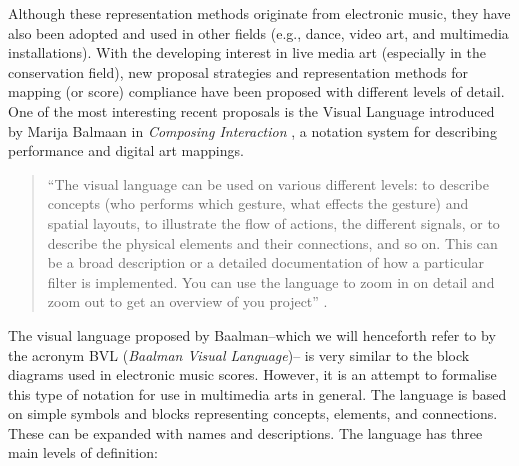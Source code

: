 Although these representation methods originate from electronic music, they have also been adopted and used in other fields (e.g., dance, video art, and multimedia installations). With the developing interest in live media art (especially in the conservation field), new proposal strategies and representation methods for mapping (or score) compliance have been proposed with different levels of detail. One of the most interesting recent proposals is the Visual Language introduced by Marija Balmaan in \textit{Composing Interaction} \cite{baalman2022composing}, a notation system for describing performance and digital art mappings.\\
\begin{quote}
    “The visual language can be used on various different levels: to describe concepts (who performs which gesture, what effects the gesture) and spatial layouts, to illustrate the flow of actions, the different signals, or to describe the physical elements and their connections, and so on. This can be a broad description or a detailed documentation of how a particular filter is implemented. You can use the language to zoom in on detail and zoom out to get an overview of you project” \cite{baalman2022composing}.
\end{quote}
The visual language proposed by Baalman–which we will henceforth refer to by the acronym BVL (\textit{Baalman Visual Language})– is very similar to the block diagrams used in electronic music scores. However, it is an attempt to formalise this type of notation for use in multimedia arts in general. The language is based on simple symbols and blocks representing concepts, elements, and connections. These can be expanded with names and descriptions. The language has three main levels of definition:
